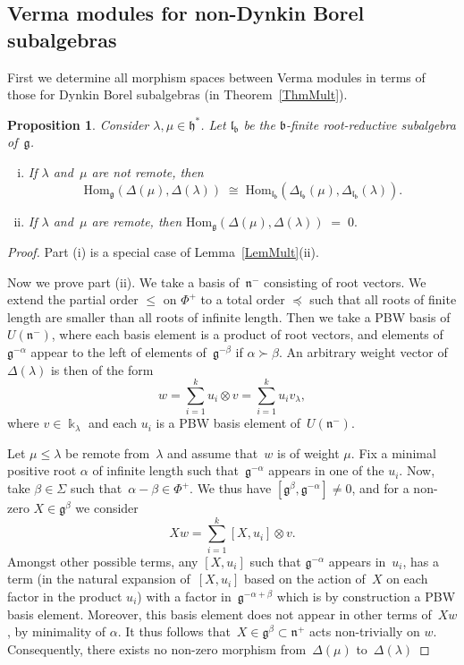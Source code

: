 \documentclass[11pt]{amsart}
\newcommand{\rR}{\Phi}
\newcommand{\Hom}{\mathrm{Hom}}
\newcommand{\mk}{\Bbbk}
\newcommand{\fn}{\mathfrak{n}}
\newcommand{\fg}{\mathfrak{g}}
\newcommand{\fl}{\mathfrak{l}}
\newcommand{\fh}{\mathfrak{h}}
\newcommand{\fb}{\mathfrak{b}}
\numberwithin{equation}{section}
\theoremstyle{plain}
\newtheorem{prop}[subsubsection]{Proposition}
\theoremstyle{remark}
\theoremstyle{remark}
\theoremstyle{construction}
\begin{document}
\subsection{Verma modules for non-Dynkin Borel subalgebras}
First we determine all morphism spaces between Verma modules in terms of those for Dynkin Borel subalgebras (in Theorem~\ref{ThmMult}).  %
\begin{prop}\label{PropHomVerma}
Consider $\lambda,\mu\in\fh^\ast$.
Let $\fl_{\fb}$ be the $\fb$-finite root-reductive subalgebra of~$\fg$.
\begin{enumerate}[(i)]
\item If $\lambda$ and~$\mu$ are not remote, then 
$$\Hom_{\fg}(\Delta(\mu),\Delta(\lambda))\;\cong\;\Hom_{\fl_{\fb}}(\Delta_{\fl_{\fb}}(\mu),\Delta_{\fl_{\fb}}(\lambda)).$$
\item If $\lambda$ and~$\mu$ are remote, then $\Hom_{\fg}(\Delta(\mu),\Delta(\lambda))\;=\;0.$
\end{enumerate}
\end{prop}
\begin{proof}Part (i) is a special case of Lemma~\ref{LemMult}(ii).


Now we prove part (ii). We take a basis of~$\fn^-$ consisting of root vectors. We extend the partial order $\le$ on $\rR^+$ to a total order $\preceq$ such that all roots of finite length are smaller than all roots of infinite length. Then we take a PBW basis of~$U(\fn^-)$, where each basis element is a product of root vectors, and elements of~$\fg^{-\alpha}$ appear to the left of elements of~$\fg^{-\beta}$ if $\alpha\succ \beta$. An arbitrary weight vector of~$\Delta(\lambda)$ is then of the form
$$w=\sum_{i=1}^k u_i\otimes v=\sum_{i=1}^k u_iv_\lambda,$$
{where} $v\in \mk_\lambda$ and each $u_i$ {is} a PBW basis element of~$U(\fn^-)$. 


Let $\mu\le \lambda$ be remote from~$\lambda$ and assume that~$w$ is of weight $\mu$.
{Fix} a minimal positive root $\alpha$ of infinite length such that~$\fg^{-\alpha}$ appears in one of the $u_i$. Now, take $\beta\in\Sigma $ such that~$\alpha-\beta\in \rR^+$. We thus have $[\fg^\beta,\fg^{-\alpha}]\not=0$, and for a non-zero $X\in \fg^\beta$ we consider 
$$Xw=\sum_{i=1}^k [X,u_i]\otimes v.$$
Amongst other possible terms, any $[X,u_i]$ such that $\fg^{-\alpha}$ appears in~$u_i$, has a term (in the natural expansion of~$[X,u_i]$ based on the action of~$X$ on each factor in the product $u_i$) with a factor in~$\fg^{-\alpha+\beta}$ which is by construction a PBW basis element. Moreover, this basis element does not appear in other terms of~$Xw$, by minimality of $\alpha$.
It thus follows that~$X\in \fg^\beta\subset\fn^+$ acts non-trivially on $w$. Consequently, there exists no non-zero morphism from~$\Delta(\mu)$ to~$\Delta(\lambda)$
\end{proof}
\end{document}
